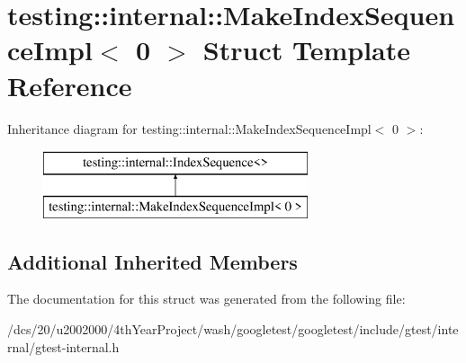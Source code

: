 \hypertarget{structtesting_1_1internal_1_1MakeIndexSequenceImpl_3_010_01_4}{}\section{testing\+:\+:internal\+:\+:Make\+Index\+Sequence\+Impl$<$ 0 $>$ Struct Template Reference}
\label{structtesting_1_1internal_1_1MakeIndexSequenceImpl_3_010_01_4}
Inheritance diagram for testing\+:\+:internal\+:\+:Make\+Index\+Sequence\+Impl$<$ 0 $>$\+:\begin{figure}[H]
\begin{center}
\leavevmode
\includegraphics[height=2.000000cm]{structtesting_1_1internal_1_1MakeIndexSequenceImpl_3_010_01_4}
\end{center}
\end{figure}
\subsection*{Additional Inherited Members}


The documentation for this struct was generated from the following file\+:\begin{DoxyCompactItemize}
\item 
/dcs/20/u2002000/4th\+Year\+Project/wash/googletest/googletest/include/gtest/internal/gtest-\/internal.\+h\end{DoxyCompactItemize}
